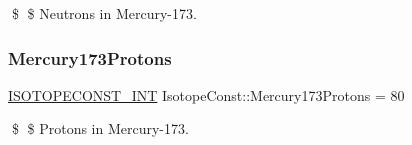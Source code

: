 \$ \$ Neutrons in Mercury-\/173. \mbox{\label{group___isotope_const-_mercury-_hg173_gaafa18abf571d582bdff3f806eeaee8bf}} 
\subsubsection{\texorpdfstring{Mercury173\+Protons}{Mercury173Protons}}
{\footnotesize\ttfamily \mbox{\hyperlink{group___isotope_const-_macros_ga5f18360b3e99483a35c32d789e62621c}{I\+S\+O\+T\+O\+P\+E\+C\+O\+N\+S\+T\+\_\+\+I\+NT}} Isotope\+Const\+::\+Mercury173\+Protons = 80}

\$ \$ Protons in Mercury-\/173. 